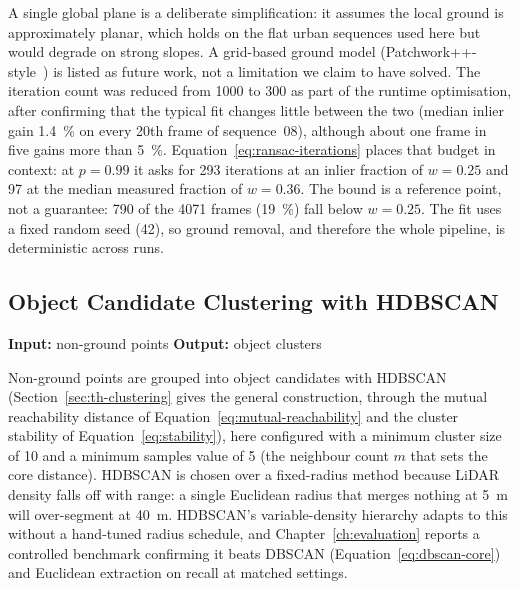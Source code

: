 A single global plane is a deliberate simplification: it assumes the local ground
is approximately planar, which holds on the flat urban sequences used here but
would degrade on strong slopes. A grid-based ground model (Patchwork++-style~\cite{lee2022patchworkpp}) is
listed as future work, not a limitation we claim to have solved. The iteration
count was reduced from \num{1000} to \num{300} as part of the runtime optimisation, after
confirming that the typical fit changes little between the two (median inlier gain
\SI{1.4}{\percent} on every 20th frame of sequence~08), although about one frame in five gains
more than \SI{5}{\percent}. Equation~\eqref{eq:ransac-iterations} places that budget in
context: at $p=\num{0.99}$ it asks for \num{293} iterations at an inlier fraction of
$w=\num{0.25}$ and \num{97} at the median measured fraction of $w=\num{0.36}$. The bound is a
reference point, not a guarantee: \num{790} of the \num{4071} frames (\SI{19}{\percent}) fall
below $w=\num{0.25}$. The fit uses a fixed random seed (\num{42}), so ground
removal, and therefore the whole pipeline, is deterministic across runs.

\subsection{Object Candidate Clustering with HDBSCAN}
\label{sec:pipeline-cluster}

\noindent \textbf{Input:} non-ground points \quad \textbar \quad \textbf{Output:} object clusters \vspace{0.5em}

Non-ground points are grouped into object candidates with HDBSCAN
(Section~\ref{sec:th-clustering} gives the general construction, through the mutual
reachability distance of Equation~\eqref{eq:mutual-reachability} and the cluster stability of
Equation~\eqref{eq:stability}), here
configured with a minimum cluster size of \num{10} and a minimum samples value of \num{5}
(the neighbour count $m$ that sets the core distance). HDBSCAN is chosen over a fixed-radius method
because LiDAR density falls off with range: a single Euclidean radius that merges
nothing at \SI{5}{\meter} will over-segment at \SI{40}{\meter}. HDBSCAN's
variable-density hierarchy adapts to this without a hand-tuned radius schedule,
and Chapter~\ref{ch:evaluation} reports a controlled benchmark confirming it beats
DBSCAN (Equation~\eqref{eq:dbscan-core}) and Euclidean extraction on recall at matched settings.

